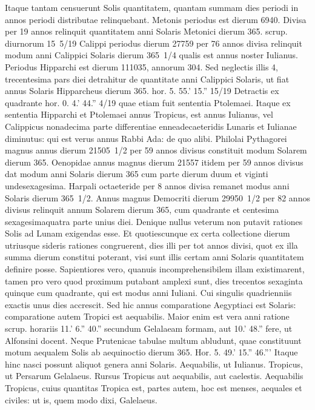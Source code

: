 Itaque tantam
censuerunt Solis quantitatem, quantam summam dies periodi in annos
periodi distributae relinquebant.
Metonis periodus est dierum
6940.
Divisa per 19 annos relinquit quantitatem anni Solaris Metonici
dierum 365. scrup. diurnorum 15~5/19 Calippi periodus dierum
27759 per 76 annos divisa relinquit modum anni Calippici Solaris
dierum 365~1/4 qualis est annus noster Iulianus.
Periodus Hipparchi
est dierum 111035, annorum 304.
Sed neglectis illis 4,
trecentesima pars diei detrahitur de quantitate anni Calippici Solaris,
ut fiat annus Solaris Hipparcheus
 dierum 365. hor. 5. 55.' 15.'' 15/19
Detractis ex quadrante hor. 0. 4.' 44.'' 4/19 quae etiam fuit sententia
Ptolemaei.
Itaque ex sententia Hipparchi et Ptolemaei annus
Tropicus, est annus Iulianus, vel Calippicus nonadecima parte
differentiae enneadecaeteridis Lunaris et Iulianae diminutus: qui
est verus annus Rabbi Ada: de quo alibi.
Philolai Pythagorei magnus
annus dierum 21505~1/2 per 59 annos divisus constituit modum
Solarem dierum 365.
Oenopidae annus magnus dierum 21557
itidem per 59 annos divisus dat modum anni Solaris dierum 365 cum
parte dierum duum et viginti undesexagesima.
Harpali octaeteride per
8 annos divisa remanet modus anni Solaris dierum 365~1/2.
Annus magnus
Democriti dierum 29950~1/2 per 82 annos divisus relinquit annum
Solarem dierum 365, cum quadrante et centesima sexagesimaquatra
parte unius diei.
Denique nullus veterum non putavit rationes
Solis ad Lunam exigendas esse.
Et quotiescunque ex certa collectione
dierum utriusque sideris rationes congruerent, dies illi per tot
annos divisi, quot ex illa summa dierum constitui poterant, visi sunt
illis certam anni Solaris quantitatem definire posse.
Sapientiores vero,
quanuis incomprehensibilem illam existimarent, tamen pro vero quod
proximum putabant amplexi sunt, dies trecentos sexaginta quinque
cum quadrante, qui est modus anni Iuliani.
Cui singulis quadrienniis
exactis unus dies accrescit.
Sed hic annus comparatione Aegyptiaci
est Solaris: comparatione autem Tropici est aequabilis.
Maior
enim est vera anni ratione scrup. horariis 11.' 6.'' 40.'' secundum
Gelalaeam formam, aut 10.' 48.'' fere, ut Alfonsini docent.
Neque
Prutenicae tabulae multum abludunt, quae constituunt motum
aequalem Solis ab aequinoctio dierum 365. Hor. 5. 49.' 15.'' 46.'''
Itaque hinc nasci possunt aliquot genera anni Solaris.
Aequabilis,
ut Iulianus.
Tropicus, ut Persarum Gelalaeus.
Rursus Tropicus
aut aequabilis, aut caelestis.
Aequabilis
Tropicus, cuius quantitas
Tropica est, partes autem, hoc est menses, aequales et civiles: ut is,
quem modo dixi, Galelaeus.

